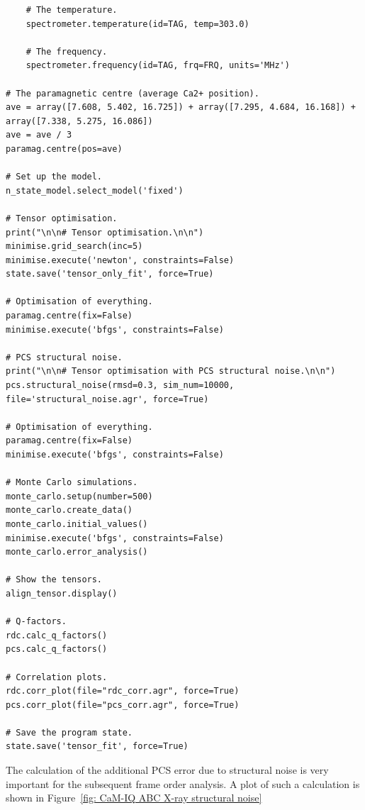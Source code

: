 \begin{lstlisting}
    # The temperature.
    spectrometer.temperature(id=TAG, temp=303.0)

    # The frequency.
    spectrometer.frequency(id=TAG, frq=FRQ, units='MHz')

# The paramagnetic centre (average Ca2+ position).
ave = array([7.608, 5.402, 16.725]) + array([7.295, 4.684, 16.168]) + array([7.338, 5.275, 16.086])
ave = ave / 3
paramag.centre(pos=ave)

# Set up the model.
n_state_model.select_model('fixed')

# Tensor optimisation.
print("\n\n# Tensor optimisation.\n\n")
minimise.grid_search(inc=5)
minimise.execute('newton', constraints=False)
state.save('tensor_only_fit', force=True)

# Optimisation of everything.
paramag.centre(fix=False)
minimise.execute('bfgs', constraints=False)

# PCS structural noise.
print("\n\n# Tensor optimisation with PCS structural noise.\n\n")
pcs.structural_noise(rmsd=0.3, sim_num=10000, file='structural_noise.agr', force=True)

# Optimisation of everything.
paramag.centre(fix=False)
minimise.execute('bfgs', constraints=False)

# Monte Carlo simulations.
monte_carlo.setup(number=500)
monte_carlo.create_data()
monte_carlo.initial_values()
minimise.execute('bfgs', constraints=False)
monte_carlo.error_analysis()

# Show the tensors.
align_tensor.display()

# Q-factors.
rdc.calc_q_factors()
pcs.calc_q_factors()

# Correlation plots.
rdc.corr_plot(file="rdc_corr.agr", force=True)
pcs.corr_plot(file="pcs_corr.agr", force=True)

# Save the program state.
state.save('tensor_fit', force=True)
\end{lstlisting}

The calculation of the additional PCS error due to structural noise is very important for the subsequent frame order analysis.
A plot of such a calculation is shown in Figure~\ref{fig: CaM-IQ ABC X-ray structural noise}

